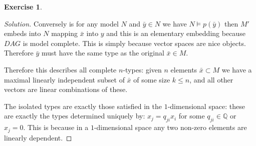 \documentclass{article}
\renewcommand{\qedsymbol}{\raisebox{-0.5cm}{}}
\newcommand{\Q}{\mathbb{Q}}
\newenvironment{solution}{\begin{proof}[Solution]\renewcommand\qedsymbol{}}{\end{proof}}
\theoremstyle{definition}
\newtheorem{question}{Exercise}
\begin{document}
\begin{question}
\begin{enumerate}[(1)]
\begin{solution}
                  Conversely is for any model \(N\) and \(\bar{y}\in N\) we have
                  \(N\models p(\bar{y})\) then \(M'\) embeds into \(N\) mapping
                  \(\bar{x}\) into \(y\) and this is an elementary embedding
                  because \(DAG\) is model complete. This is simply because
                  vector spaces are nice objects. Therefore \(\bar{y}\) must
                  have the same type as the original \(\bar{x}\in M\).

                  Therefore this describes all complete \(n\)-types: given \(n\)
                  elements \(\bar{x}\subset M\) we have a maximal linearly
                  independent subset of \(\bar{x}\) of some size \(k\leq n\),
                  and all other vectors are linear combinations of these.

                  The isolated types are exactly those satisfied in the
                  \(1\)-dimensional space: these are exactly the types
                  determined uniquely by: \(x_{j}=q_{ji}x_{i}\) for some
                  \(q_{ji}\in\Q\) or \(x_{j}=0\). This is because in a
                  \(1\)-dimensional space any two non-zero elements are linearly
                  dependent.
              \end{solution}
    \end{enumerate}
\end{question}
\end{document}
